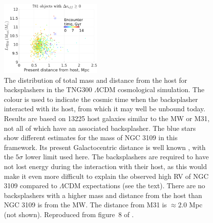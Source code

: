 \documentclass[fleqn,usenatbib,useAMS]{mnras} %
\begin{document}
\begin{figure}
	\centering
	\includegraphics[width=0.45\textwidth]{Banik_2021_backplash_Figure_8}
	\caption{The distribution of total mass and distance from the host for backsplashers in the TNG300 $\Lambda$CDM cosmological simulation. The colour is used to indicate the cosmic time when the backsplasher interacted with its host, from which it may well be unbound today. Results are based on 13225 host galaxies similar to the MW or M31, not all of which have an associated backsplasher. The blue stars show different estimates for the mass of NGC 3109 in this framework. Its present Galactocentric distance is well known \citep{Soszynski_2006, Dalcanton_2009}, with the $5\sigma$ lower limit used here. The backsplashers are required to have not lost energy during the interaction with their host, as this would make it even more difficult to explain the observed high RV of NGC 3109 compared to $\Lambda$CDM expectations (see the text). There are no backsplashers with a higher mass and distance from the host than NGC 3109 is from the MW. The distance from M31 is $\approx 2.0$ Mpc (not shown). Reproduced from figure~8 of \citet{Banik_2021_backsplash}.}
	\label{Banik_2021_backplash_Figure_8}
\end{figure}
\end{document}
